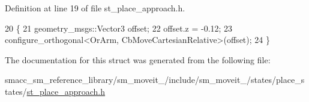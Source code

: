Definition at line 19 of file st\+\_\+place\+\_\+approach.\+h.


\begin{DoxyCode}
20     \{
21         geometry\_msgs::Vector3 offset;
22         offset.z = -0.12;
23         configure\_orthogonal<OrArm, CbMoveCartesianRelative>(offset);
24     \}
\end{DoxyCode}


The documentation for this struct was generated from the following file\+:\begin{DoxyCompactItemize}
\item 
smacc\+\_\+sm\+\_\+reference\+\_\+library/sm\+\_\+moveit\+\_/include/sm\+\_\+moveit\+\_/states/place\+\_\+states/\hyperlink{2_2include_2sm__moveit__2_2states_2place__states_2st__place__approach_8h}{st\+\_\+place\+\_\+approach.\+h}\end{DoxyCompactItemize}
